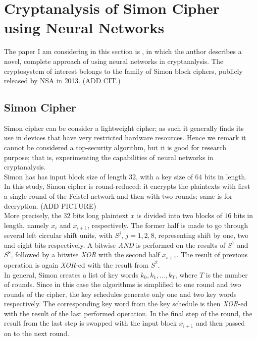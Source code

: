 \documentclass[%
    corpo=11pt,
    twoside,
    stile=classica,
    oldstyle,
    autoretitolo,
    tipotesi=magistrale,
    greek,
    evenboxes,
    english
]{toptesi}
\begin{document}
\section{Cryptanalysis of Simon Cipher using Neural Networks}
The paper I am considering in this section is \cite{jay}, in which the author describes a novel, complete approach of using neural networks in cryptanalysis. The cryptosystem of interest belongs to the family of Simon block ciphers, publicly released by NSA in 2013. (ADD CIT.)  
\subsection{Simon Cipher}
Simon cipher can be consider a lightweight cipher; as such it generally finds its use in devices that have very restricted hardware resources. Hence we remark it cannot be considered a top-security algorithm, but it is good for research purpose; that is, experimenting the capabilities of neural networks in cryptanalysis. \\
Simon has has input block size of length $32$, with a key size of $64$ bits in length. In this study, Simon cipher is round-reduced: it encrypts the plaintexts with first a single round of the Feistel network and then with two rounds; same is for decryption. (ADD PICTURE)\\
More precisely, the $32$ bits long plaintext $x$ is divided into two blocks of $16$ bits in length, namely $x_i$ and $x_{i+1}$, respectively. The former half is made to go through several left circular shift units, with $S^j$, $j = 1,2,8$, representing shift by one, two and eight bits respectively. A bitwise \textit{AND} is performed on the results of $S^1$ and $S^8$, followed by a bitwise \textit{XOR} with the second half $x_{i+1}$. The result of previous operation is again \textit{XOR}-ed with the result from $S^2$. \\
In general, Simon creates a list of key words $k_0, k_1, \dots, k_T$, where $T$ is the number of rounds. Since in this case the algorithms is simplified to one round and two rounds of the cipher, the key schedules generate only one and two key words respectively. The corresponding key word from the key schedule is then \textit{XOR}-ed with the result of the last performed operation. In the final step of the round, the result from the last step is swapped with the input block $x_{i+1}$ and then passed on to the next round.
\end{document}

